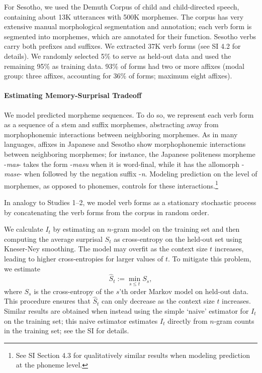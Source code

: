 For Sesotho, we used the Demuth Corpus \citep{demuth1992acquisition} of child and child-directed speech, containing about 13K utterances with 500K morphemes.
The corpus has very extensive manual morphological segmentation and annotation; each verb form is segmented into morphemes, which are annotated for their function.
Sesotho verbs carry both prefixes and suffixes.
We extracted 37K verb forms (see SI 4.2 for details).
We randomly selected 5\% to serve as held-out data and used the remaining 95\% as training data.
93\% of forms had two or more affixes (modal group: three affixes, accounting for 36\% of forms; maximum eight affixes).


\paragraph{Estimating Memory-Surprisal Tradeoff}
We model predicted morpheme sequences.
To do so, we represent each verb form as a sequence of a stem and suffix morphemes, abstracting away from morphophonemic interactions between neighboring morphemes.
As in many languages, affixes in Japanese and Sesotho show morphophonemic interactions between neighboring morphemes; for instance, the Japanese politeness morpheme -\textit{mas}- takes the form -\textit{masu} when it is word-final, while it has the allomorph -\textit{mase}- when followed by the negation suffix -\textit{n}.
Modeling prediction on the level of morphemes, as opposed to phonemes, controls for these interactions.\footnote{See SI Section 4.3 for qualitatively similar results when modeling prediction at the phoneme level.}

In analogy to Studies 1--2, we model verb forms as a stationary stochastic process by concatenating the verb forms from the corpus in random order.

We calculate $I_t$ by estimating an $n$-gram model on the training set and then computing the average surprisal $S_t$ as cross-entropy on the held-out set using Kneser-Ney smoothing.
The model may overfit as the context size $t$ increases, leading to higher cross-entropies for larger values of $t$.
To mitigate this problem, we estimate
\begin{equation}
\hat{S}_t := \min_{s \leq t} S_s,
\end{equation}
where $S_s$ is the cross-entropy of the $s$'th order Markov model on held-out data.
This procedure ensures that $\hat{S}_t$ can only decrease as the context size $t$ increases.
Similar results are obtained when instead using the simple `naive' estimator for $I_t$ on the training set; this naive estimator estimates $I_t$ directly from $n$-gram counts in the training set; see the SI for details.

